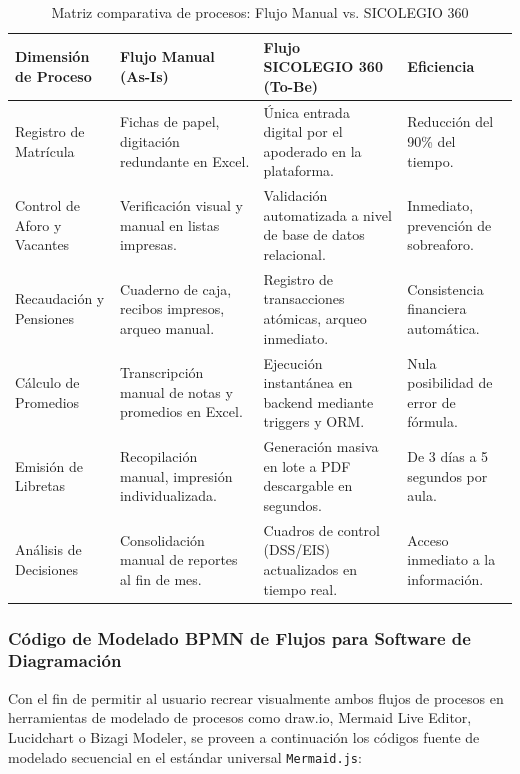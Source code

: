 \documentclass[12pt,a4paper,oneside]{report}
\renewcommand{\arraystretch}{1.35}
\begin{document}
\begin{table}[H]
\centering
\caption{Matriz comparativa de procesos: Flujo Manual vs. SICOLEGIO 360}
\label{tab:comparacion_bpmn}
\renewcommand{\arraystretch}{1.3}

\begin{tabularx}{\textwidth}{|X|X|X|X|}
\hline
\textbf{Dimensión de Proceso} &
\textbf{Flujo Manual (As-Is)} &
\textbf{Flujo SICOLEGIO 360 (To-Be)} &
\textbf{Eficiencia} \\
\hline

Registro de Matrícula &
Fichas de papel, digitación redundante en Excel. &
Única entrada digital por el apoderado en la plataforma. &
Reducción del 90\% del tiempo. \\
\hline

Control de Aforo y Vacantes &
Verificación visual y manual en listas impresas. &
Validación automatizada a nivel de base de datos relacional. &
Inmediato, prevención de sobreaforo. \\
\hline

Recaudación y Pensiones &
Cuaderno de caja, recibos impresos, arqueo manual. &
Registro de transacciones atómicas, arqueo inmediato. &
Consistencia financiera automática. \\
\hline

Cálculo de Promedios &
Transcripción manual de notas y promedios en Excel. &
Ejecución instantánea en backend mediante triggers y ORM. &
Nula posibilidad de error de fórmula. \\
\hline

Emisión de Libretas &
Recopilación manual, impresión individualizada. &
Generación masiva en lote a PDF descargable en segundos. &
De 3 días a 5 segundos por aula. \\
\hline

Análisis de Decisiones &
Consolidación manual de reportes al fin de mes. &
Cuadros de control (DSS/EIS) actualizados en tiempo real. &
Acceso inmediato a la información. \\
\hline

\end{tabularx}
\end{table}
\subsubsection{Código de Modelado BPMN de Flujos para Software de Diagramación}

Con el fin de permitir al usuario recrear visualmente ambos flujos de procesos en herramientas de modelado de procesos como draw.io, Mermaid Live Editor, Lucidchart o Bizagi Modeler, se proveen a continuación los códigos fuente de modelado secuencial en el estándar universal \texttt{Mermaid.js}:
\end{document}
